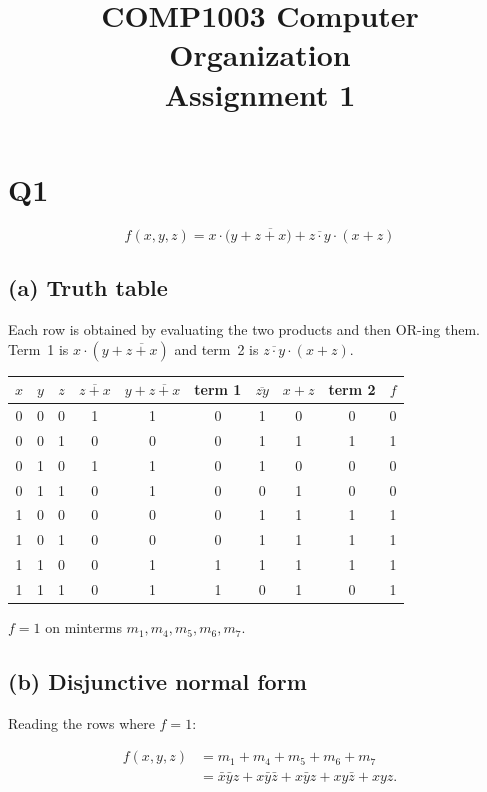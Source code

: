 \documentclass[11pt,a4paper]{article}
\title{COMP1003 Computer Organization\\Assignment 1}
\author{}
\date{}
\begin{document}
\maketitle
\thispagestyle{empty}

\section*{Q1}

\[
f(x,y,z)=x\cdot\bigl(y+\overline{z+x}\bigr)+\overline{z\cdot y}\cdot(x+z)
\]

\subsection*{(a) Truth table}

Each row is obtained by evaluating the two products and then OR-ing them.
Term~1 is \(x\cdot(y+\overline{z+x})\) and term~2 is \(\overline{z\cdot y}\cdot(x+z)\).

\begin{center}
\small
\setlength{\tabcolsep}{5pt}
\begin{tabular}{ccc ccc ccc c}
\toprule
\(x\) & \(y\) & \(z\)
  & \(\overline{z+x}\) & \(y+\overline{z+x}\) & term 1
  & \(\overline{zy}\) & \(x+z\) & term 2
  & \(f\) \\
\midrule
0 & 0 & 0 & 1 & 1 & 0 & 1 & 0 & 0 & 0 \\
0 & 0 & 1 & 0 & 0 & 0 & 1 & 1 & 1 & 1 \\
0 & 1 & 0 & 1 & 1 & 0 & 1 & 0 & 0 & 0 \\
0 & 1 & 1 & 0 & 1 & 0 & 0 & 1 & 0 & 0 \\
1 & 0 & 0 & 0 & 0 & 0 & 1 & 1 & 1 & 1 \\
1 & 0 & 1 & 0 & 0 & 0 & 1 & 1 & 1 & 1 \\
1 & 1 & 0 & 0 & 1 & 1 & 1 & 1 & 1 & 1 \\
1 & 1 & 1 & 0 & 1 & 1 & 0 & 1 & 0 & 1 \\
\bottomrule
\end{tabular}
\end{center}

\(f=1\) on minterms \(m_1,m_4,m_5,m_6,m_7\).

\subsection*{(b) Disjunctive normal form}

Reading the rows where \(f=1\):

\begin{align*}
f(x,y,z)
&= m_1+m_4+m_5+m_6+m_7 \\
&= \bar{x}\bar{y}z + x\bar{y}\bar{z} + x\bar{y}z + xy\bar{z} + xyz.
\end{align*}
\end{document}
